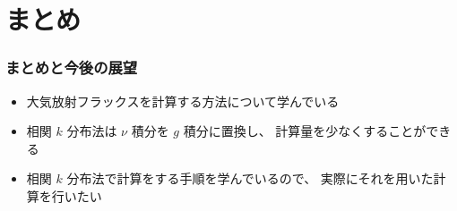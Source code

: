 \documentclass[unicode,colorlinks]{beamer}
\begin{document}
% 

\section{まとめ}

\begin{frame}
	\frametitle{まとめと今後の展望}
	\begin{itemize}
		\item 大気放射フラックスを計算する方法について学んでいる
		\item 相関 $k$ 分布法は $\nu$ 積分を $g$ 積分に置換し、
			計算量を少なくすることができる
	\end{itemize}
	
	\begin{itemize}
		\item 相関 $k$ 分布法で計算をする手順を学んでいるので、
			実際にそれを用いた計算を行いたい
	\end{itemize}
\end{frame}
\end{document}
